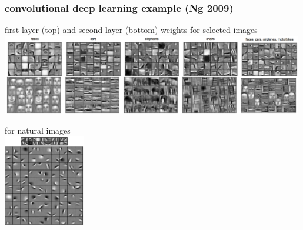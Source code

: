 \documentclass[USenglish,pdftex,compress,10pt,svgnamesi,handout]{beamer}
\begin{document}
\begin{frame}
\frametitle{convolutional deep learning example (Ng 2009)}
\begin{center}
first layer (top) and second layer (bottom) weights for selected images 
\includegraphics[width=0.99\textwidth]{pics/ng2009-1.png}

 for natural images \\
\includegraphics[height=4cm]{pics/ng2009-2.png}
\end{center}
\end{frame}



%
%
%
%
%
%
%
%
%
%
%
%
%
%
%
%
%
%
%
%
%
%
%
%
%
%
%
%
\end{document}
